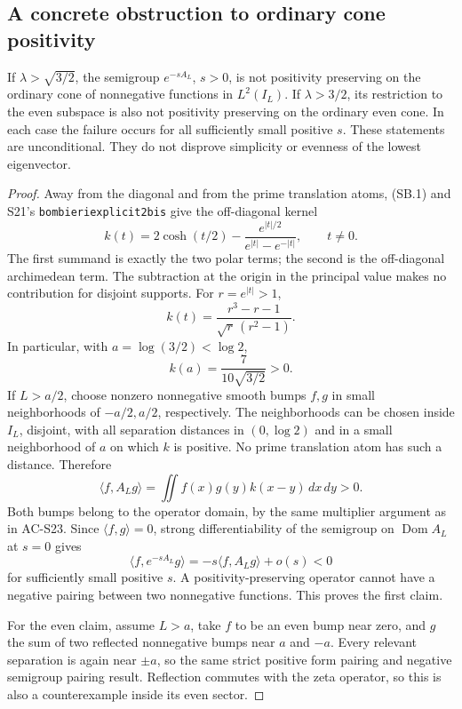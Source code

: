\subsection{A concrete obstruction to ordinary cone positivity}

\begin{proposition}
\label{AC-S26}
If \(\lambda>\sqrt{3/2}\), the semigroup \(e^{-sA_L}\),
\(s>0\), is not positivity preserving on the ordinary cone
of nonnegative functions in \(L^2(I_L)\).
If \(\lambda>3/2\), its restriction to the even subspace is
also not positivity preserving on the ordinary even cone.
In each case the failure occurs for all sufficiently small
positive \(s\).
These statements are unconditional.  They do not disprove
simplicity or evenness of the lowest eigenvector.
\end{proposition}
\begin{proof}
Away from the diagonal and from the prime translation atoms,
(SB.1) and S21's \texttt{bombieriexplicit2bis} give the
off-diagonal kernel
\[
 k(t)=2\cosh(t/2)-
       \frac{e^{|t|/2}}{e^{|t|}-e^{-|t|}},\qquad t\ne0 .
                                                               \tag{SB.17}
\]
The first summand is exactly the two polar terms; the second is
the off-diagonal archimedean term.  The subtraction at the origin
in the principal value makes no contribution for disjoint supports.
For \(r=e^{|t|}>1\),
\[
 k(t)=\frac{r^3-r-1}{\sqrt r\,(r^2-1)} .
\]
In particular, with \(a=\log(3/2)<\log2\),
\[
 k(a)=\frac7{10\sqrt{3/2}}>0 .
\]
If \(L>a/2\), choose nonzero nonnegative smooth bumps \(f,g\)
in small neighborhoods of \(-a/2,a/2\), respectively.
The neighborhoods can be chosen inside \(I_L\), disjoint, with
all separation distances in \((0,\log2)\) and in a small
neighborhood of \(a\) on which \(k\) is positive.
No prime translation atom has such a distance.  Therefore
\[
 \langle f,A_Lg\rangle
     =\iint f(x)g(y)k(x-y)\,dx\,dy>0 .
\]
Both bumps belong to the operator domain, by the same multiplier
argument as in AC-S23.  Since \(\langle f,g\rangle=0\),
strong differentiability of the semigroup on
\(\operatorname{Dom}A_L\) at \(s=0\) gives
\[
 \langle f,e^{-sA_L}g\rangle
       =-s\langle f,A_Lg\rangle+o(s)<0
\]
for sufficiently small positive \(s\).
A positivity-preserving operator cannot have a negative pairing
between two nonnegative functions.  This proves the first claim.

For the even claim, assume \(L>a\), take \(f\) to be an even bump
near zero, and \(g\) the sum of two reflected nonnegative bumps
near \(a\) and \(-a\).  Every relevant separation is again near
\(\pm a\), so the same strict positive form pairing and negative
semigroup pairing result.  Reflection commutes with the zeta
operator, so this is also a counterexample inside its even sector.
\end{proof}


